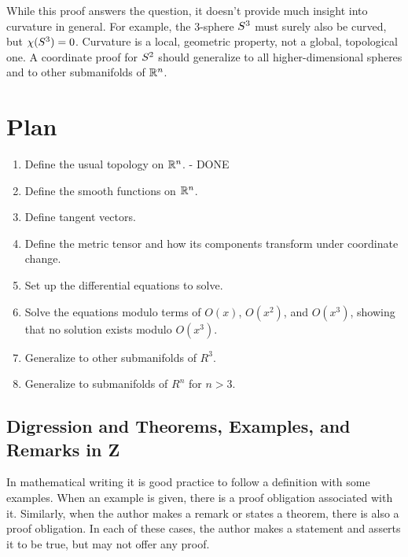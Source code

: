 \documentclass[11pt, oneside]{article}
\begin{document}
While this proof answers the question, it doesn't provide much insight into curvature in general.
For example, the 3-sphere $S^3$ must surely also be curved, but $\chi(S^3) = 0$.
Curvature is a local, geometric property, not a global, topological one.
A coordinate proof for $S^2$ should generalize to all higher-dimensional spheres and to other submanifolds of $\mathbb{R}^n$.

\section{Plan}

\begin{enumerate}

\item Define the usual topology on $\mathbb{R}^n$. - DONE

\item Define the smooth functions on $\mathbb{R}^n$.

\item Define tangent vectors.

\item Define the metric tensor and how its components transform under coordinate change.

\item Set up the differential equations to solve.

\item Solve the equations modulo terms of $O(x)$, $O(x^2)$, and $O(x^3)$, showing that no solution exists
modulo $O(x^3)$.

\item Generalize to other submanifolds of $R^3$.

\item Generalize to submanifolds of $R^n$ for $n > 3$.

\end{enumerate}

\subsection{Digression and Theorems, Examples, and Remarks in Z}

In mathematical writing it is good practice to follow a definition with some examples.
When an example is given, there is a proof obligation associated with it.
Similarly, when the author makes a remark or states a theorem, there is also a proof obligation.
In each of these cases, the author makes a statement and asserts it to be true, but may not offer any proof.
\end{document}
